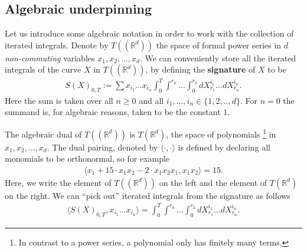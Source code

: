 \documentclass{scrartcl}
\theoremstyle{plain}
\theoremstyle{definition}
\newcommand{\R}{\mathbb{R}}
\newcommand{\1}[1]{1_{\{#1\}}}
\newcommand{\ds}{d} %
\newcommand{\TC}{T((\R^\ds))} %
\newcommand{\TS}{T(\R^\ds)} %
\begin{document}
%
%
%
%



\subsection{Algebraic underpinning}

Let us introduce some algebraic notation in order to work with the collection of iterated integrals.
%
Denote by $\TC$ the space of formal power series in $\ds$ \textit{non-commuting} variables $x_1, x_2, \dots, x_{\ds}$.
%
We can conveniently store all the iterated integrals of the curve $X$ in $\TC$,
by defining the \textbf{signature} of $X$ to be
\begin{align*}
  S(X)_{0,T} := \sum x_{i_1} \dots x_{i_n} \int_0^T \int^{r_n} \dots \int_0^{r_2} dX^{i_1}_{r_1} \dots dX^{i_n}_{r_n}.
\end{align*}
Here the sum is taken over all $n \ge 0$ and all $i_1, \dots, i_n \in \{1,2,..,\ds\}$.
For $n=0$ the summand is, for algebraic reasons, taken to be the constant $1$.


The algebraic dual of $\TC$ is $\TS$, the space of polynomials%
\footnote{
  In contrast to a power series, a polynomial only has finitely many terms.
}
in $x_1, x_2, \dots, x_{\ds}$.
The dual pairing, denoted by $\langle \cdot, \cdot \rangle$ is defined by declaring all monomials to be orthonormal, 
so for example
\begin{align*}
  \Big\langle x_1  + 15\cdot x_1 x_2 - 2\cdot x_1 x_2 x_1, x_1 x_2 \Big\rangle = 15.
\end{align*}
Here, we write the element of $\TC$ on the left and the element of $\TS$ on the right.
We can ``pick out'' iterated integrals from the signature as follows
\begin{align*}
  \Big\langle S(X)_{0,T}, x_{i_1} \dots x_{i_n} \Big\rangle
  =
  \int_0^T \int^{r_n} \dots \int_0^{r_2} dX^{i_1}_{r_1} \dots dX^{i_n}_{r_n}.
\end{align*}
\end{document}
